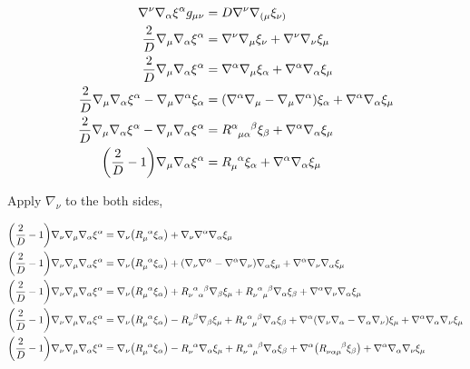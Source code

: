 \begin{align*}
    \nabla^\nu\nabla_\alpha \xi^\alpha g_{\mu\nu}&=D\nabla^\nu\nabla_{(\mu}\xi_{\nu)}\\
    \frac2D\nabla_\mu\nabla_\alpha \xi^\alpha &=\nabla^\nu\nabla_{\mu}\xi_{\nu}+\nabla^\nu\nabla_{\nu}\xi_{\mu}\\
    \frac2D\nabla_\mu\nabla_\alpha \xi^\alpha &=\nabla^\alpha\nabla_{\mu}\xi_{\alpha}+\nabla^\alpha\nabla_{\alpha}\xi_{\mu}\\
    \frac2D\nabla_\mu\nabla_\alpha \xi^\alpha -\nabla_\mu\nabla^\alpha\xi_\alpha&=\qty(\nabla^\alpha\nabla_{\mu}-\nabla_\mu\nabla^\alpha)\xi_{\alpha}+\nabla^\alpha\nabla_{\alpha}\xi_{\mu}\\
    \frac2D\nabla_\mu\nabla_\alpha \xi^\alpha -\nabla_\mu\nabla_\alpha\xi^\alpha&=\tensor{R}{^\alpha_\mu_\alpha^\beta}\xi_{\beta}+\nabla^\alpha\nabla_{\alpha}\xi_{\mu}\\
    \qty(\frac2D-1)\nabla_\mu\nabla_\alpha \xi^\alpha &=\tensor{R}{_\mu^\alpha}\xi_{\alpha}+\nabla^\alpha\nabla_{\alpha}\xi_{\mu}
\end{align*}

Apply $\nabla_\nu$ to the both sides,

\begin{align*}
    \qty(\frac2D-1)\nabla_\nu\nabla_\mu\nabla_\alpha \xi^\alpha &=\nabla_\nu\qty(\tensor{R}{_\mu^\alpha}\xi_{\alpha})+\nabla_\nu\nabla^\alpha\nabla_{\alpha}\xi_{\mu}\\
    \qty(\frac2D-1)\nabla_\nu\nabla_\mu\nabla_\alpha \xi^\alpha &=\nabla_\nu\qty(\tensor{R}{_\mu^\alpha}\xi_{\alpha})+\qty(\nabla_\nu\nabla^\alpha-\nabla^\alpha\nabla_\nu)\nabla_{\alpha}\xi_{\mu}+\nabla^\alpha\nabla_\nu\nabla_\alpha\xi_\mu\\
    \qty(\frac2D-1)\nabla_\nu\nabla_\mu\nabla_\alpha \xi^\alpha &=\nabla_\nu\qty(\tensor{R}{_\mu^\alpha}\xi_{\alpha})+\tensor{R}{_\nu^\alpha_\alpha^\beta}\nabla_{\beta}\xi_{\mu}+\tensor{R}{_\nu^\alpha_\mu^\beta}\nabla_{\alpha}\xi_{\beta}+\nabla^\alpha\nabla_\nu\nabla_\alpha\xi_\mu\\
    \qty(\frac2D-1)\nabla_\nu\nabla_\mu\nabla_\alpha \xi^\alpha &=\nabla_\nu\qty(\tensor{R}{_\mu^\alpha}\xi_{\alpha})-\tensor{R}{_\nu^\beta}\nabla_{\beta}\xi_{\mu}+\tensor{R}{_\nu^\alpha_\mu^\beta}\nabla_{\alpha}\xi_{\beta}+\nabla^\alpha\qty(\nabla_\nu\nabla_\alpha-\nabla_\alpha\nabla_\nu)\xi_\mu+\nabla^\alpha\nabla_\alpha\nabla_\nu\xi_\mu\\
    \qty(\frac2D-1)\nabla_\nu\nabla_\mu\nabla_\alpha \xi^\alpha &=\nabla_\nu\qty(\tensor{R}{_\mu^\alpha}\xi_{\alpha})-\tensor{R}{_\nu^\alpha}\nabla_{\alpha}\xi_{\mu}+\tensor{R}{_\nu^\alpha_\mu^\beta}\nabla_{\alpha}\xi_{\beta}+\nabla^\alpha\qty(\tensor{R}{_\nu_\alpha_\mu^\beta}\xi_\beta)+\nabla^\alpha\nabla_\alpha\nabla_\nu\xi_\mu
\end{align*}

